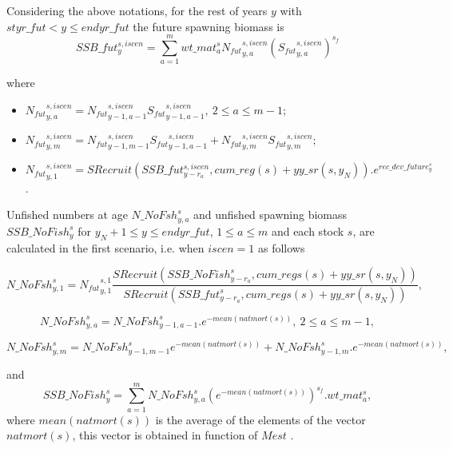 \documentclass{article}
\begin{document}
Considering the above notations, for the rest of years $y$ with  $styr\_fut < y \leq endyr\_fut$ the future spawning biomass is
\begin{equation}
    SSB\_fut^{s,iscen}_y = \sum_{a=1}^m wt\_mat^s_{a} {N_{fut}}^{s,iscen}_{y,a} ({S_{fut}}^{s,iscen}_{y,a})^{s_f}
\end{equation}

where

\begin{itemize}
   \item ${N_{fut}}^{s,iscen}_{y,a}={N_{fut}}^{s,iscen}_{y-1,a-1}{S_{fut}}^{s,iscen}_{y-1,a-1},  \ 2\leq a \leq m-1$;

    \item ${N_{fut}}^{s,iscen}_{y,m}={N_{fut}}^{s,iscen}_{y-1,m-1}{S_{fut}}^{s,iscen}_{y-1,a-1} + {N_{fut}}^{s,iscen}_{y,m}{S_{fut}}^{s,iscen}_{y,m}$;

    \item ${N_{fut}}^{s,iscen}_{y,1}=SRecruit(SSB\_fut^{s,iscen}_{y-r_a},cum\_reg(s)+yy\_sr(s,y_N)). e^{rec\_dev\_future^s_y}$.
\end{itemize}


Unfished numbers at age $N\_NoFsh^s_{y,a}$ and unfished spawning biomass $SSB\_NoFish^s_y$ for $y_N+1\leq y \leq endyr\_fut$, $1\leq a \leq m$ and each stock $s$, are calculated in the first scenario, i.e. when $iscen = 1$ as follows

\begin{equation}
    N\_NoFsh^{s}_{y,1}={N_{fut}}^{s,1}_{y,1}\dfrac{SRecruit(SSB\_NoFish^s_{y-r_a},cum\_regs(s)+yy\_sr(s,y_N))}{SRecruit(SSB\_fut^s_{y-r_a},cum\_regs(s)+yy\_sr(s,y_N))},
\end{equation}

\begin{equation}
    N\_NoFsh^{s}_{y,a}=N\_NoFsh^s_{y-1,a-1}.e^{-mean(natmort(s))}, \ 2\leq a\leq m-1,
\end{equation}

\begin{equation}
    N\_NoFsh^s_{y,m}=N\_NoFsh^s_{y-1,m-1}e^{-mean(natmort(s))}+N\_NoFsh^s_{y-1,m}.e^{-mean(natmort(s))},
\end{equation}

and
\begin{equation}
    SSB\_NoFish^s_y = \sum_{a=1}^mN\_NoFsh^s_{y,a}(e^{-mean(natmort(s))})^{s_f}.wt\_{mat}^s_a,
\end{equation}
where $mean(natmort(s))$ is the average of the elements of the vector $natmort(s)$,
this vector is obtained in function of $Mest$ %
.
\end{document}
